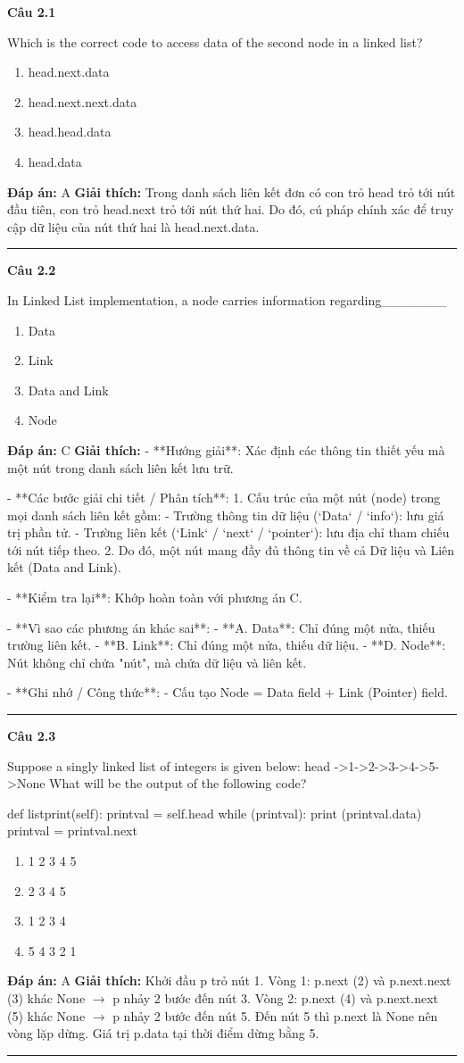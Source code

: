 \documentclass[11pt,a4paper]{article}
\newenvironment{question}[1]{%
  \par\vspace{1em}\noindent\textbf{\large Câu #1}\par\vspace{0.4em}
}{%
  \par\vspace{1em}\hrule\vspace{0.6em}
}
\newenvironment{choices}{%
  \begin{enumerate}[label=\textbf{\Alph*.},leftmargin=2.2em,itemsep=2pt,topsep=3pt]
}{%
  \end{enumerate}
}
\newcommand{\choice}{\item}
\newenvironment{codebox}{%
  \begin{tcolorbox}[colback=gray!8!white,colframe=gray!50!black,arc=1.5mm,boxrule=0.6pt,left=3mm,right=3mm,top=2.5mm,bottom=2.5mm]
  \ttfamily\small
}{%
  \end{tcolorbox}
}
\begin{document}
\begin{question}{2.1}
Which is the correct code to access data of the second node in a linked list?
\begin{choices}
\choice head.next.data
\choice head.next.next.data
\choice head.head.data
\choice head.data
\end{choices}
\textbf{Đáp án:} A
\textbf{Giải thích:} Trong danh sách liên kết đơn có con trỏ head trỏ tới nút đầu tiên, con trỏ head.next trỏ tới nút thứ hai. Do đó, cú pháp chính xác để truy cập dữ liệu của nút thứ hai là head.next.data.
\end{question}

\begin{question}{2.2}
In Linked List implementation, a node carries information regarding_______
\begin{choices}
\choice Data
\choice Link
\choice Data and Link
\choice Node
\end{choices}
\textbf{Đáp án:} C
\textbf{Giải thích:} - **Hướng giải**:
  Xác định các thông tin thiết yếu mà một nút trong danh sách liên kết lưu trữ.

- **Các bước giải chi tiết / Phân tích**:
  1. Cấu trúc của một nút (node) trong mọi danh sách liên kết gồm:
     - Trường thông tin dữ liệu (`Data` / `info`): lưu giá trị phần tử.
     - Trường liên kết (`Link` / `next` / `pointer`): lưu địa chỉ tham chiếu tới nút tiếp theo.
  2. Do đó, một nút mang đầy đủ thông tin về cả Dữ liệu và Liên kết (Data and Link).

- **Kiểm tra lại**:
  Khớp hoàn toàn với phương án C.

- **Vì sao các phương án khác sai**:
  - **A. Data**: Chỉ đúng một nửa, thiếu trường liên kết.
  - **B. Link**: Chỉ đúng một nửa, thiếu dữ liệu.
  - **D. Node**: Nút không chỉ chứa "nút", mà chứa dữ liệu và liên kết.

- **Ghi nhớ / Công thức**:
  - Cấu tạo Node = Data field + Link (Pointer) field.
\end{question}

\begin{question}{2.3}
Suppose a singly linked list of integers is given below: head ->1->2->3->4->5->None What will be the output of the following code?
\begin{codebox}
def listprint(self):
    printval = self.head
    while (printval):
        print (printval.data)
        printval = printval.next
\end{codebox}
\begin{choices}
\choice 1 2 3 4 5
\choice 2 3 4 5
\choice 1 2 3 4
\choice 5 4 3 2 1
\end{choices}
\textbf{Đáp án:} A
\textbf{Giải thích:} Khởi đầu p trỏ nút 1. Vòng 1: p.next (2) và p.next.next (3) khác None \(\to\) p nhảy 2 bước đến nút 3. Vòng 2: p.next (4) và p.next.next (5) khác None \(\to\) p nhảy 2 bước đến nút 5. Đến nút 5 thì p.next là None nên vòng lặp dừng. Giá trị p.data tại thời điểm dừng bằng 5.
\end{question}
\end{document}
